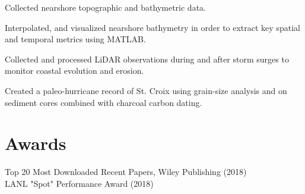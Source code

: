 \documentclass[]{deedy-resume-openfont}
\begin{document}
\begin{minipage}[t]{0.60\textwidth}
\begin{tightemize}
	\item Collected nearshore topographic and bathymetric data.
	\item Interpolated, and visualized nearshore bathymetry in order to extract key spatial and temporal metrics using MATLAB.
\end{tightemize}
\sectionsep

\begin{tightemize}
	\item Collected and processed LiDAR observations during and after storm surges to monitor coastal evolution and erosion.
	\item Created a paleo-hurricane record of St. Croix using grain-size analysis and on sediment cores combined with charcoal carbon dating.
\end{tightemize}
\sectionsep



\section{Awards}
Top 20 Most Downloaded Recent Papers, Wiley Publishing (2018)\\
LANL "Spot" Performance Award (2018)


	
\end{minipage}
\end{document}
